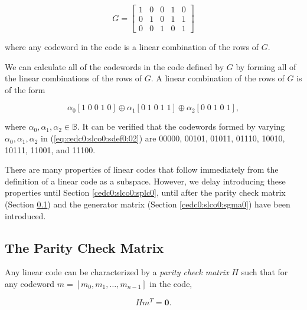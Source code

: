 \begin{equation}
\label{eq:cedc0:slco0:sdef0:01}
G = \left[
    \begin{array}{ccccc}
    1&0&0&1&0 \\
    0&1&0&1&1 \\
    0&0&1&0&1 
    \end{array}
    \right]
\end{equation}

\noindent{}where any codeword in the code is a linear combination of the rows
of $G$.

We can calculate all of the codewords in the code defined by $G$ by
forming all of the linear combinations of the rows of $G$.
A linear combination of the rows of $G$ is of the form

\begin{equation}
\label{eq:cedc0:slco0:sdef0:02}
\alpha_0 [1\;0\;0\;1\;0]
\oplus
\alpha_1 [0\;1\;0\;1\;1]
\oplus
\alpha_2 [0\;0\;1\;0\;1],
\end{equation}

\noindent{}where $\alpha_0, \alpha_1, \alpha_2 \in \mathbb{B}$.
It can be verified that the codewords formed by varying
$\alpha_0, \alpha_1, \alpha_2$ in (\ref{eq:cedc0:slco0:sdef0:02})
are 00000, 00101, 01011, 01110, 10010, 10111, 11001, and 11100.

There are many properties of linear codes that follow immediately
from the definition of a linear code as a subspace.  However, we 
delay introducing these properties until Section \ref{cedc0:slco0:splc0}, 
until after the parity check matrix (Section \ref{cedc0:slco0:spcm0}) and the
generator matrix (Section \ref{cedc0:slco0:sgma0}) have been introduced.


\subsection{The Parity Check Matrix}
\label{cedc0:slco0:spcm0}

Any linear code can be characterized by a 
\emph{parity check matrix} $H$ such that
for any codeword $m = [m_0, m_1, \ldots{}, m_{n-1}]$ in the 
code, 

\begin{equation}
\label{eq:cedc0:slco0:spcm0:01}
H m^T = \mathbf{0}  .
\end{equation}

